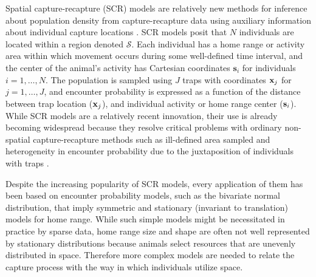 \documentclass[12pt]{article}
\begin{document}
Spatial capture-recapture (SCR) models are relatively new methods for
inference about population density from capture-recapture data using
auxiliary information about individual capture locations
\citep{efford:2004,borchers_efford:2008, royle_young:2008}.  SCR
models posit that $N$ individuals are located within a region denoted
$\mathcal{S}$. Each individual has a home range or activity area
within which movement occurs during some well-defined time interval,
and the center of the animal's activity has Cartesian coordinates
$\mathbf{s}_i$ for individuals $i=1,\ldots,N$. The population is sampled using $J$
traps with coordinates ${\bf x}_{j}$ for $j=1,\ldots,J$, and encounter
probability is expressed as a function of the distance between trap
location (${\bf x}_{j}$), and individual activity or home range center (${\bf
  s}_{i}$).
While SCR models are a relatively recent innovation, their use is already becoming widespread
\citep{efford_etal:2009ecol, gardner_etal:2010jwm,
  gardner_etal:2010ecol,kery_etal:2011, gopalaswamy_etal:2012ecol,
  foster_harmsen:2012} because they resolve critical problems with
ordinary non-spatial capture-recapture methods such as ill-defined
area sampled and heterogeneity in encounter probability due to the
juxtaposition of individuals with traps
\citep{borchers:2011}.

Despite the increasing popularity of SCR models, every
application of them has been based on encounter probability
models, such as the bivariate normal distribution, that imply
symmetric and stationary (invariant to translation) models for home range.
While such simple models might be necessitated in practice by sparse
data, 
home range size and shape are often not well represented by stationary
distributions because animals select
resources 
that
are unevenly distributed in space. Therefore 
more complex models are needed to relate the capture 
process with the way in which individuals utilize
space. 
\end{document}
